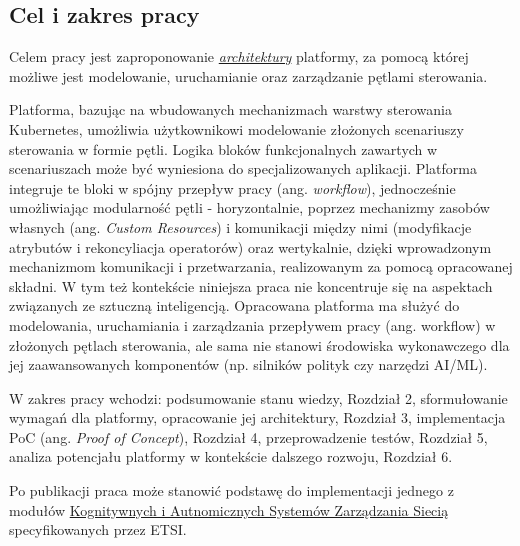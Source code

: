 \subsection{Cel i zakres pracy}

Celem pracy jest zaproponowanie \hyperlink{def:architektura}{\textit{architektury}} platformy, za pomocą której możliwe jest modelowanie, uruchamianie oraz zarządzanie pętlami sterowania. 

Platforma, bazując na wbudowanych mechanizmach warstwy sterowania Kubernetes, umożliwia użytkownikowi modelowanie złożonych scenariuszy sterowania w formie pętli. Logika bloków funkcjonalnych zawartych w scenariuszach może być wyniesiona do specjalizowanych aplikacji. Platforma integruje te bloki w spójny przepływ pracy (ang. \textit{workflow}), jednocześnie umożliwiając modularność pętli - horyzontalnie, poprzez mechanizmy zasobów własnych (ang. \textit{Custom Resources}) i komunikacji między nimi (modyfikacje atrybutów i rekoncyliacja operatorów) oraz wertykalnie, dzięki wprowadzonym mechanizmom komunikacji i przetwarzania, realizowanym za pomocą opracowanej składni.  W tym też kontekście niniejsza praca nie koncentruje się na aspektach związanych ze sztuczną inteligencją. Opracowana platforma ma służyć do modelowania, uruchamiania i zarządzania przepływem pracy (ang. workflow) w złożonych pętlach sterowania, ale sama nie stanowi środowiska wykonawczego dla jej zaawansowanych komponentów (np. silników polityk czy narzędzi AI/ML).

W zakres pracy wchodzi: podsumowanie stanu wiedzy, Rozdział 2, sformułowanie wymagań dla platformy, opracowanie jej architektury, Rozdział 3, implementacja PoC (ang. \textit{Proof of Concept}), Rozdział 4, przeprowadzenie testów, Rozdział 5, analiza potencjału platformy w kontekście dalszego rozwoju, Rozdział 6.

Po publikacji praca może stanowić podstawę do implementacji jednego z modułów \hyperlink{def:kognitywny-system-zarzadzania-siecia}{Kognitywnych i Autnomicznych  Systemów Zarządzania Siecią} specyfikowanych przez ETSI.